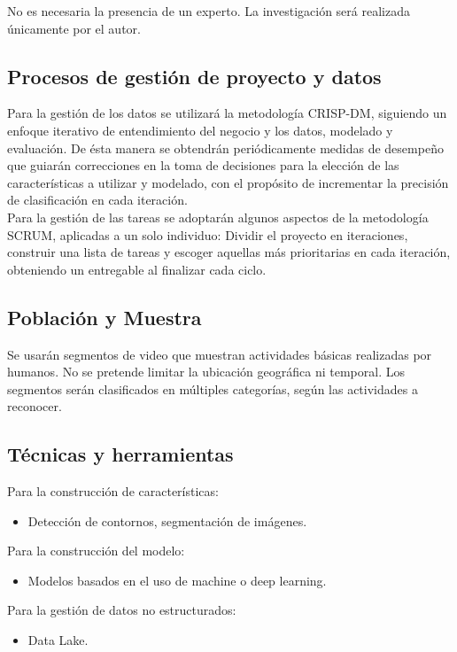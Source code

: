 No es necesaria la presencia de un experto. La investigación será realizada únicamente por el autor.

\subsection{Procesos de gestión de proyecto y datos}

Para la gestión de los datos se utilizará la metodología CRISP-DM, siguiendo un enfoque iterativo de entendimiento del negocio y los datos, modelado y evaluación. De ésta manera se obtendrán periódicamente medidas de desempeño que guiarán correcciones en la toma de decisiones para la elección de las características a utilizar y modelado, con el propósito de incrementar la precisión de clasificación en cada iteración. \\

Para la gestión de las tareas se adoptarán algunos aspectos de la metodología SCRUM, aplicadas a un solo individuo: Dividir el proyecto en iteraciones, construir una lista de tareas y escoger aquellas más prioritarias en cada iteración, obteniendo un entregable al finalizar cada ciclo.

\subsection{Población y Muestra}

Se usarán segmentos de video que muestran actividades básicas realizadas por humanos. No se pretende limitar la ubicación geográfica ni temporal. Los segmentos serán clasificados en múltiples categorías, según las actividades a reconocer.

\subsection{Técnicas y herramientas}

Para la construcción de características:
\begin{itemize}
	\item Detección de contornos, segmentación de imágenes.
\end{itemize}

Para la construcción del modelo:
\begin{itemize}
	\item Modelos basados en el uso de machine o deep learning.
\end{itemize}

Para la gestión de datos no estructurados:
\begin{itemize}
	\item Data Lake.
\end{itemize}

